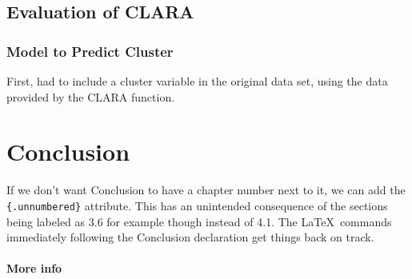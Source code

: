 \documentclass[12pt,twoside]{amherstthesis}
\begin{document}
  \begin{Shaded}
  \begin{Highlighting}[]
  \OperatorTok{::}
  \end{Highlighting}
  \end{Shaded}
  
  \section{Evaluation of CLARA}\label{evaluation-of-clara}
  
  \subsection{Model to Predict Cluster}\label{model-to-predict-cluster}
  
  First, had to include a cluster variable in the original data set, using
  the data provided by the CLARA function.
  
  \begin{Shaded}
  \begin{Highlighting}[]
  \StringTok{ }\OperatorTok{$}
  \StringTok{ }
  \end{Highlighting}
  \end{Shaded}
  
  \chapter*{Conclusion}\label{conclusion}
  
  \setcounter{chapter}{4} \setcounter{section}{0}
  
  If we don't want Conclusion to have a chapter number next to it, we can
  add the \texttt{\{.unnumbered\}} attribute. This has an unintended
  consequence of the sections being labeled as 3.6 for example though
  instead of 4.1. The \LaTeX~commands immediately following the Conclusion
  declaration get things back on track.
  
  \subsubsection{More info}\label{more-info}
  
\end{document}
